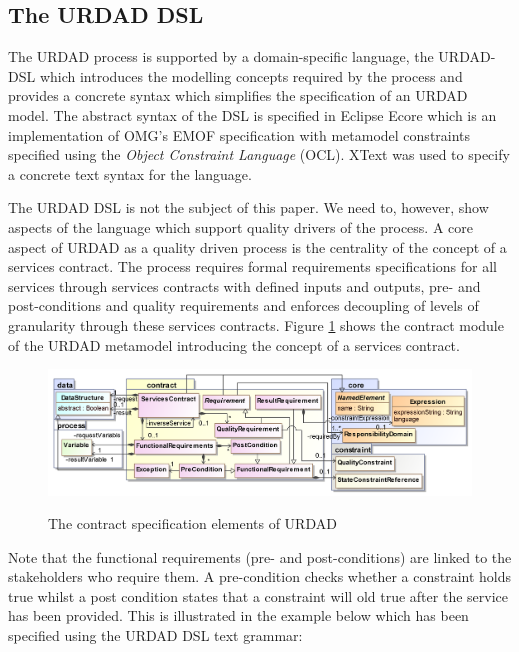 \subsection{The URDAD DSL}
\label{sec:urdadDsl}

The URDAD process is supported by a domain-specific language, the URDAD-DSL which introduces the modelling concepts required by the process and provides a concrete syntax which simplifies the specification of an URDAD model. The abstract syntax of the DSL is specified in Eclipse Ecore which is an implementation of OMG's EMOF specification with metamodel constraints specified using the \emph{Object Constraint Language} (OCL). XText was used to specify a concrete text syntax for the language. 

The URDAD DSL is not the subject of this paper. We need to, however, show aspects of the language which support quality drivers of the process.
A core aspect of URDAD as a quality driven process is the centrality of the concept of a services contract. The process requires formal requirements specifications for all services through services contracts with defined inputs and outputs, pre- and post-conditions and quality requirements and enforces decoupling of levels of granularity through these services contracts. Figure \ref{fig:contractModule} shows the contract module of the URDAD metamodel introducing the concept of a services contract.

\begin{figure}[thbp]
  \centering
  \includegraphics{contract}\\   
  \caption{The contract specification elements of URDAD}
  \label{fig:contractModule}
\end{figure}

Note that the functional requirements (pre- and post-conditions) are linked to the stakeholders who require them. A pre-condition checks whether a constraint holds true whilst a post condition states that a constraint will old true after the service has been provided. This is illustrated in the example below which has been specified using the URDAD DSL text grammar:

